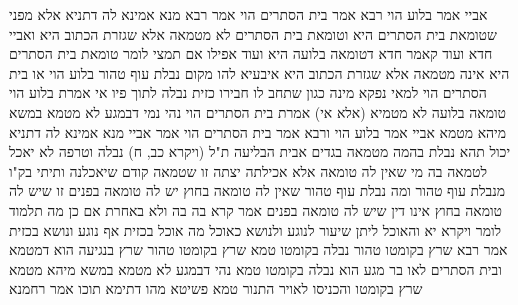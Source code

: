 \documentclass[12pt, openany]{book}
\begin{document}
{אביי אמר בלוע הוי רבא אמר בית הסתרים הוי אמר רבא מנא אמינא לה דתניא אלא מפני שטומאת בית הסתרים היא
וטומאת בית הסתרים לא מטמאה אלא שגזרת הכתוב היא 
ואביי חדא ועוד קאמר חדא דטומאה בלועה היא ועוד אפילו אם תמצי לומר טומאת בית הסתרים היא אינה מטמאה אלא שגזרת הכתוב היא 
איבעיא להו מקום נבלת עוף טהור בלוע הוי או בית הסתרים הוי 
למאי נפקא מינה כגון שתחב לו חבירו כזית נבלה לתוך פיו אי אמרת בלוע הוי טומאה בלועה לא מטמיא (אלא אי) אמרת בית הסתרים הוי נהי נמי דבמגע לא מטמא במשא מיהא מטמא
אביי אמר בלוע הוי ורבא אמר בית הסתרים הוי אמר אביי מנא אמינא לה דתניא יכול תהא נבלת בהמה מטמאה בגדים אבית הבליעה ת"ל (ויקרא כב, ח) נבלה וטרפה לא יאכל לטמאה בה
מי שאין לה טומאה אלא אכילתה יצתה זו שטמאה קודם שיאכלנה 
ותיתי בק"ו מנבלת עוף טהור ומה נבלת עוף טהור שאין לה טומאה בחוץ יש לה טומאה בפנים זו שיש לה טומאה בחוץ אינו דין שיש לה טומאה בפנים 
אמר קרא בה בה ולא באחרת 
אם כן מה תלמוד לומר {ויקרא יא } והאוכל 
ליתן שיעור לנוגע ולנושא כאוכל מה אוכל בכזית אף נוגע ונושא בכזית 
אמר רבא שרץ בקומטו טהור נבלה בקומטו טמא 
שרץ בקומטו טהור שרץ בנגיעה הוא דמטמא ובית הסתרים לאו בר מגע הוא נבלה בקומטו טמא נהי דבמגע לא מטמא במשא מיהא מטמא 
שרץ בקומטו והכניסו לאויר התנור טמא פשיטא מהו דתימא תוכו אמר רחמנא}
\end{document}

